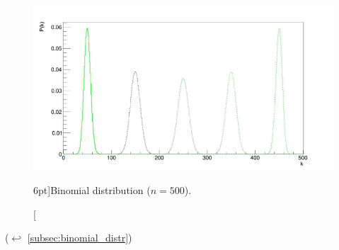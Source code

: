 \begin{figure}
	\includegraphics{exercise/binomial_distr_n_500.png}
	\caption[Binomial distribution ($n = 500$).][6pt]{Binomial distribution ($n = 500$).}
	\label{fig:binomial_distr_n_500}
\end{figure}

($\hookleftarrow$ \ref{subsec:binomial_distr})
